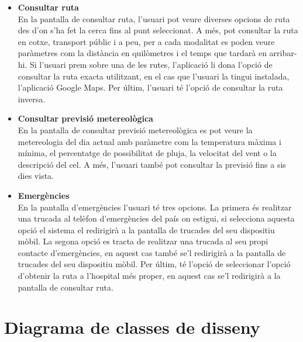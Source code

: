 \begin{itemize}
\item[]{\textbf{Consultar ruta}}\\
En la pantalla de consultar ruta, l'usuari pot veure diverses opcions de ruta des d'on s'ha fet la cerca fins al punt seleccionat. A més, pot consultar la ruta en cotxe, transport públic i a peu, per a cada modalitat es poden veure paràmetres com la distància en quilòmetres i el temps que tardarà en arribar-hi. Si l'usuari prem sobre una de les rutes, l'aplicació li dona l'opció de consultar la ruta exacta utilitzant, en el cas que l'usuari la tingui instalada, l'aplicació Google Maps. Per últim, l'usuari té l'opció de consultar la ruta inversa.\\

\item[]{\textbf{Consultar previsió metereològica}}\\
En la pantalla de consultar previsió metereològica es pot veure la metereologia del dia actual amb paràmetre com la temperatura màxima i mínima, el percentatge de possibilitat de pluja, la velocitat del vent o la descripció del cel. A més, l'usuari també pot consultar la previsió fins a sis dies vista.\\

\item[]{\textbf{Emergències}}\\
En la pantalla d'emergències l'usuari té tres opcions. La primera és realitzar una trucada al telèfon d'emergències del país on estigui, si selecciona aquesta opció el sistema el redirigirà a la pantalla de trucades del seu dispositiu mòbil. La segona opció es tracta de realitzar una trucada al seu propi contacte d'emergències, en aquest cas també se'l redirigirà a la pantalla de trucades del seu dispositiu mòbil. Per últim, té l'opció de seleccionar l'opció d'obtenir la ruta a l'hospital més proper, en aquest cas se'l redirigirà a la pantalla de consultar ruta.\\

\end{itemize}


\section{Diagrama de classes de disseny}

